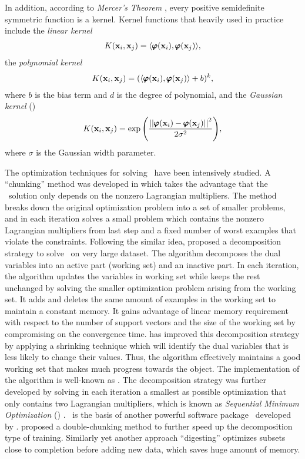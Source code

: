 {In addition, according to \textit{Mercer's Theorem} \citep{taylor04}, every positive semidefinite symmetric function is a kernel.
Kernel functions that heavily used in practice include the \textit{linear kernel}
\begin{align*}
	K(\mathbf {x}_i,\mathbf {x}_j) = \langle \pmb \varphi(\mathbf {x}_i), \pmb \varphi(\mathbf {x}_j) \rangle,
\end{align*}
the \textit{polynomial kernel}
\begin{align*}
	K(\mathbf {x}_i,\mathbf {x}_j) = (\langle \pmb \varphi(\mathbf {x}_i), \pmb \varphi(\mathbf {x}_j) \rangle + b)^k,
\end{align*}
where $b$ is the bias term and $d$ is the degree of polynomial, and the \textit{Gaussian kernel} (\rbf)
\begin{align*}
	K(\mathbf {x}_i,\mathbf {x}_j) = \exp{\left(\frac{\left|\left| {\pmb \varphi(\mathbf {x}_i)}-{\pmb \varphi(\mathbf {x}_j)} \right|\right|^2}{2\sigma^2}\right)},
\end{align*}
where $\sigma$ is the Gaussian width parameter.

The optimization techniques for solving \svm\ have been intensively studied.
A ``chunking'' method was developed in \citep{Vapnik82estimation} which takes the advantage that the \svm\ solution only depends on the nonzero Lagrangian multipliers.
The method breaks down the original optimization problem into a set of smaller problems, and in each iteration solves a small problem which contains the nonzero Lagrangian multipliers from last step and a fixed number of worst examples that violate the constraints.
Following the similar idea, \citet{Osuna97an} proposed a decomposition strategy to solve \svm\ on very large dataset.
The algorithm decomposes the dual variables into an active part (working set) and an inactive part.
In each iteration, the algorithm updates the variables in working set while keeps the rest unchanged by solving the smaller optimization problem arising from the working set.
It adds and deletes the same amount of examples in the working set to maintain a constant memory.
It gains advantage of linear memory requirement with respect to the number of support vectors and the size of the working set by compromising on the convergence time.
\citep{Joachims98making} has improved this decomposition strategy by applying a shrinking technique which will identify the dual variables that is less likely to change their values.
Thus, the algorithm effectively maintains a good working set that makes much progress towards the object.
The implementation of the algorithm is well-known as \svmlight.
The decomposition strategy was further developed by solving in each iteration a smallest as possible optimization that only contains two Lagrangian multipliers, which is known as \textit{Sequential Minimum Optimization} (\smo) \citep{Platt98sequential,Platt99fast}.
\smo\ is the basis of another powerful software package \libsvm\ developed by \citet{Chang11libsvm}.
\citet{Perezcruz04double} proposed a double-chunking method to further speed up the decomposition type of training. 
Similarly yet another approach ``digesting'' \citep{Decoste02support} optimizes subsets close to completion before adding new data, which saves huge amount of memory.

}
